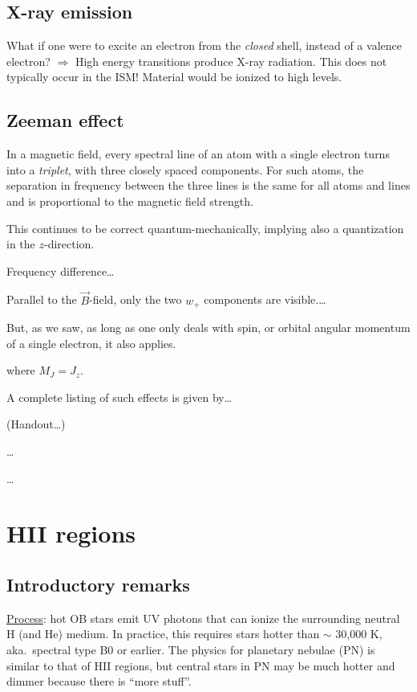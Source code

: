 \documentclass[11pt]{article}
\newcommand{\mar}[1]{\hspace{0pt}\marginpar{-\textcolor{black}{#1}-}}
\begin{document}
\subsection{X-ray emission}
\mar{I 20}What if one were to excite an electron from the \emph{closed} shell,
instead of a valence electron? $\Rightarrow$ High energy transitions
produce X-ray radiation. This does not typically occur in the ISM!
Material would be ionized to high levels.

\subsection{Zeeman effect}
In a magnetic field, every spectral line of an atom with a single electron
turns into a \textit{triplet}, with three closely spaced components.
For such atoms, the separation in frequency between the three lines
is the same for all atoms and lines and is proportional to the magnetic
field strength.

\mar{I 21}This continues to be correct quantum-mechanically, implying
also a quantization in the $z$-direction.

\mar{I 22}Frequency difference\ldots

\mar{I 23}Parallel to the $\vec{B}$-field, only the two $w_{+}$ %
components are visible.\ldots

\mar{I 24}But, as we saw, as long as one only deals with spin, or orbital
angular momentum of a single electron, it also applies.

\mar{I 25}where $M_{J} = J_{z}$.

\mar{I 26}A complete listing of such effects is given by\ldots

\mar{I 27}(Handout\ldots)

\mar{I 28}\ldots

\mar{I 29}\ldots

\newpage
\section{HII regions}
\subsection{Introductory remarks}
\mar{51}\underline{Process}: hot OB stars emit UV photons that can ionize the
surrounding neutral H (and He) medium. In practice, this requires stars hotter
than $\sim$ 30,000 K, aka.\ spectral type B0 or earlier.
The physics for planetary nebulae (PN) is similar to that of HII regions,
but central stars in PN may be much hotter and dimmer
because there is ``more stuff''.
\end{document}
